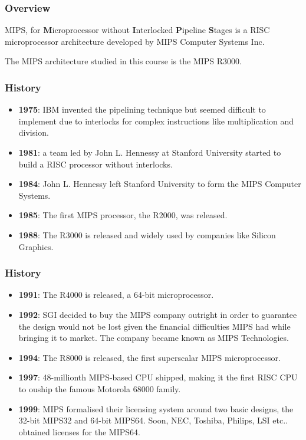 
\begin{frame}
  \frametitle{Overview}

  MIPS, for \textbf{M}icroprocessor without \textbf{I}nterlocked
  \textbf{P}ipeline \textbf{S}tages is a RISC microprocessor
  architecture developed by MIPS Computer Systems Inc.

  \nl

  The MIPS architecture studied in this course is the MIPS R3000.
\end{frame}


\begin{frame}
  \frametitle{History}

  \begin{itemize}[<+->]
    \item
      \textbf{1975}: IBM invented the pipelining technique but seemed
      difficult to implement due to interlocks for complex instructions like
      multiplication and division.
    \item
      \textbf{1981}: a team led by John L. Hennessy at Stanford University
      started to build a RISC processor without interlocks.
    \item
      \textbf{1984}: John L. Hennessy left Stanford University to form
      the MIPS Computer Systems.
    \item
      \textbf{1985}: The first MIPS processor, the R2000, was released.
    \item
      \textbf{1988}: The R3000 is released and widely used by companies like
      Silicon Graphics.
  \end{itemize}
\end{frame}


\begin{frame}
  \frametitle{History}

  \begin{itemize}[<+->]
    \item
      \textbf{1991}: The R4000 is released, a 64-bit microprocessor.
    \item
      \textbf{1992}: SGI decided to buy the MIPS company outright in order
      to guarantee the design would not be lost given the financial
      difficulties MIPS had while bringing it to market. The company became
      known as MIPS Technologies.
    \item
      \textbf{1994}: The R8000 is released, the first superscalar
      MIPS microprocessor.
    \item
      \textbf{1997}: 48-millionth MIPS-based CPU shipped, making it the
      first RISC CPU to ouship the famous Motorola 68000 family.
    \item
      \textbf{1999}: MIPS formalised their licensing system around two
      basic designs, the 32-bit MIPS32 and 64-bit MIPS64. Soon, NEC, Toshiba,
      Philips, LSI etc.. obtained licenses for the MIPS64.
  \end{itemize}
\end{frame}

